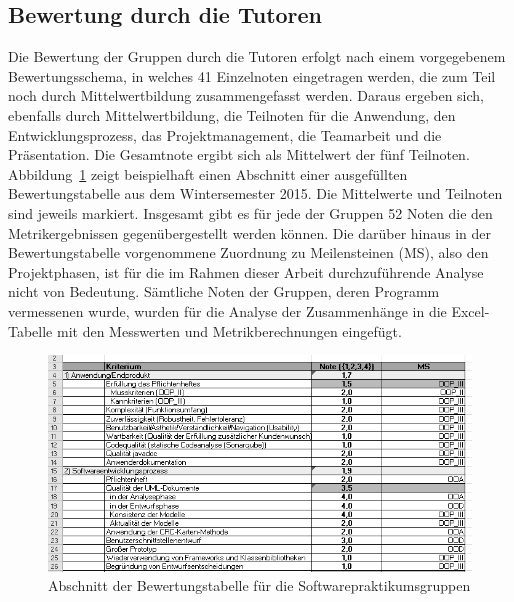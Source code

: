 \documentclass[da,ngerman]{stthesis}
\begin{document}
  			\subsection{Bewertung durch die Tutoren}
  				Die Bewertung der Gruppen durch die Tutoren erfolgt nach einem vorgegebenem Bewertungsschema, in welches 41 Einzelnoten eingetragen werden, die zum Teil noch durch Mittelwertbildung zusammengefasst werden. Daraus ergeben sich, ebenfalls durch Mittelwertbildung, die Teilnoten für die Anwendung, den Entwicklungsprozess, das Projektmanagement, die Teamarbeit und die Präsentation. Die Gesamtnote ergibt sich als Mittelwert der fünf Teilnoten. Abbildung~\ref{bewertung} zeigt beispielhaft einen Abschnitt einer ausgefüllten Bewertungstabelle aus dem Wintersemester 2015. Die Mittelwerte und Teilnoten sind jeweils markiert. Insgesamt gibt es für jede der Gruppen 52 Noten die den Metrikergebnissen gegenübergestellt werden können. Die darüber hinaus in der Bewertungstabelle vorgenommene Zuordnung zu Meilensteinen (MS), also den Projektphasen, ist für die im Rahmen dieser Arbeit durchzuführende Analyse nicht von Bedeutung. Sämtliche Noten der Gruppen, deren Programm vermessenen wurde, wurden für die Analyse der Zusammenhänge in die Excel-Tabelle mit den Messwerten und Metrikberechnungen eingefügt.
  				\begin{figure} [h]
					\centering
					\includegraphics [width=\textwidth] {bewertung.png}
					\caption{Abschnitt der Bewertungstabelle für die Softwarepraktikumsgruppen}
					\label{bewertung}
				\end{figure}
\end{document}
